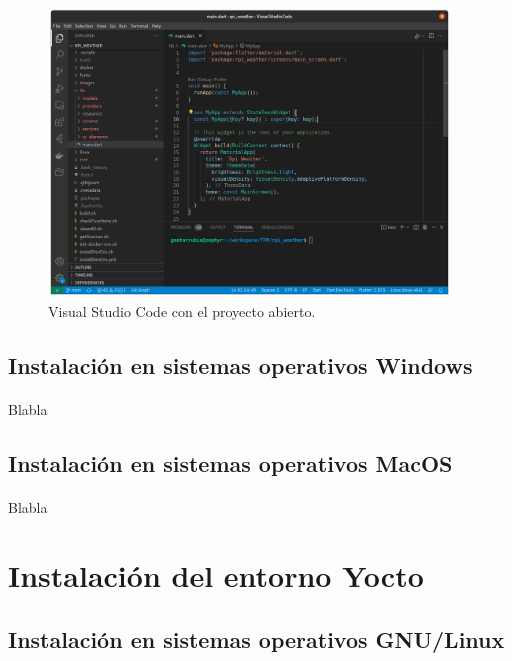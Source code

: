 \begin{figure}[H]
    \centering
    \includegraphics[width=0.95\textwidth]{imgs/vscode-ready}
	\caption[Visual Studio Code]{Visual Studio Code con el proyecto abierto.}
	\label{imgs:vscode-ready}
\end{figure}


\subsection{Instalación en sistemas operativos Windows}

\paragraph{}Blabla

\subsection{Instalación en sistemas operativos MacOS}

\paragraph{}Blabla

\section{Instalación del entorno Yocto}

\subsection{Instalación en sistemas operativos GNU/Linux}


